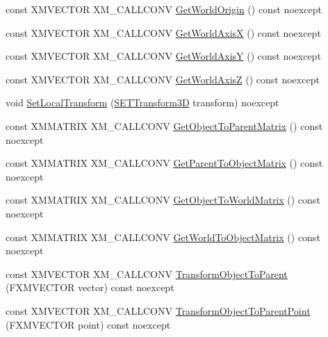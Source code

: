 \begin{DoxyCompactItemize}
\item 
const X\+M\+V\+E\+C\+T\+OR X\+M\+\_\+\+C\+A\+L\+L\+C\+O\+NV \mbox{\hyperlink{classmage_1_1_transform_a1458cffad0cf017a2302200b2679a906}{Get\+World\+Origin}} () const noexcept
\item 
const X\+M\+V\+E\+C\+T\+OR X\+M\+\_\+\+C\+A\+L\+L\+C\+O\+NV \mbox{\hyperlink{classmage_1_1_transform_aeb6b744fbe9843a7323fdde88421c3b4}{Get\+World\+AxisX}} () const noexcept
\item 
const X\+M\+V\+E\+C\+T\+OR X\+M\+\_\+\+C\+A\+L\+L\+C\+O\+NV \mbox{\hyperlink{classmage_1_1_transform_ab62a58130aae5e4094b9d6455b4b2561}{Get\+World\+AxisY}} () const noexcept
\item 
const X\+M\+V\+E\+C\+T\+OR X\+M\+\_\+\+C\+A\+L\+L\+C\+O\+NV \mbox{\hyperlink{classmage_1_1_transform_a7be63b8fa0f661504404c33572b1c66b}{Get\+World\+AxisZ}} () const noexcept
\item 
void \mbox{\hyperlink{classmage_1_1_transform_aea61e643a669b5c8be12f5b70fee917d}{Set\+Local\+Transform}} (\mbox{\hyperlink{classmage_1_1_s_e_t_transform3_d}{S\+E\+T\+Transform3D}} transform) noexcept
\item 
const X\+M\+M\+A\+T\+R\+IX X\+M\+\_\+\+C\+A\+L\+L\+C\+O\+NV \mbox{\hyperlink{classmage_1_1_transform_a9026a83f1441c9efefc7a67e005a833d}{Get\+Object\+To\+Parent\+Matrix}} () const noexcept
\item 
const X\+M\+M\+A\+T\+R\+IX X\+M\+\_\+\+C\+A\+L\+L\+C\+O\+NV \mbox{\hyperlink{classmage_1_1_transform_a89ea42ba5daef39d8683bb69847d275e}{Get\+Parent\+To\+Object\+Matrix}} () const noexcept
\item 
const X\+M\+M\+A\+T\+R\+IX X\+M\+\_\+\+C\+A\+L\+L\+C\+O\+NV \mbox{\hyperlink{classmage_1_1_transform_af26e8771a10357032391a0a5f88a56fb}{Get\+Object\+To\+World\+Matrix}} () const noexcept
\item 
const X\+M\+M\+A\+T\+R\+IX X\+M\+\_\+\+C\+A\+L\+L\+C\+O\+NV \mbox{\hyperlink{classmage_1_1_transform_af415c8f2b8d22e69df2878044b9414c5}{Get\+World\+To\+Object\+Matrix}} () const noexcept
\item 
const X\+M\+V\+E\+C\+T\+OR X\+M\+\_\+\+C\+A\+L\+L\+C\+O\+NV \mbox{\hyperlink{classmage_1_1_transform_a622f8234d70768c33a3cbb8fa50932cc}{Transform\+Object\+To\+Parent}} (F\+X\+M\+V\+E\+C\+T\+OR vector) const noexcept
\item 
const X\+M\+V\+E\+C\+T\+OR X\+M\+\_\+\+C\+A\+L\+L\+C\+O\+NV \mbox{\hyperlink{classmage_1_1_transform_a2d93dac4ae0b5b2723d2fbce077da85f}{Transform\+Object\+To\+Parent\+Point}} (F\+X\+M\+V\+E\+C\+T\+OR point) const noexcept

\end{DoxyCompactItemize}
